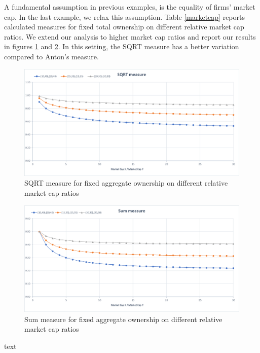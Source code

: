 \begin{appendices}
A fundamental assumption in previous examples, is the equality of firms' market cap. In the last example, we relax this assumption. Table \ref{marketcap} reports calculated measures for fixed total ownership on different relative market cap ratios. We extend our analysis to higher market cap ratios and report our results in figures \ref{sqrtMarket} and \ref{sumMarket}. In this setting, the SQRT measure has a better variation compared to Anton's measure. 

				
	
					\begin{figure}[htbp]
							\centering
							\caption{ SQRT measure for fixed aggregate ownership on different relative market cap ratios}
							\label{sqrtMarket}
							\includegraphics[width=0.85\linewidth]{Elements/3.png}
						\end{figure}
						\begin{figure}[htbp]
							\centering
							\caption{ Sum measure for fixed aggregate ownership on different relative market cap ratios}
							\label{sumMarket}
							\includegraphics[width=0.85\linewidth]{Elements/4.png}
					\end{figure}
				\begin{table}[htbp]
							\centering
							\caption{text }
							\label{marketcap}
							\resizebox{0.9\textwidth}{!}
							{
								
							}
					\end{table}



\end{appendices}
